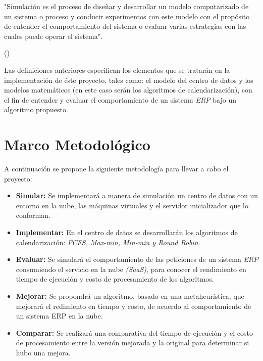 \begin{center}
	\begin{minipage}{0.8\linewidth}
		\vspace{5pt}%
		{\small
			"Simulación es el proceso de diseñar y desarrollar un modelo computarizado de un sistema o proceso y conducir experimentos con este modelo con el propósito de entender el comportamiento del sistema o evaluar varias estrategias con las cuales puede operar el sistema".
		}
		\begin{flushright}
			(\cite{shannon1976})
		\end{flushright}
		\vspace{5pt}%
	\end{minipage}
\end{center}

Las definiciones anteriores especifican los elementos que se tratarán en la implementación de éste proyecto, tales como: el modelo del centro de datos y los modelos matemáticos (en este caso serán los algoritmos de calendarización), con el fin de entender y evaluar el comportamiento de un sistema \textit{ERP} bajo un algoritmo propuesto. 
\newpage

\section{Marco Metodol\'ogico}

A continuaci\'on se propone la siguiente metodolog\'ia para llevar a cabo el proyecto:

\begin{itemize}
	\item \textbf{Simular:} Se implementar\'a a manera de simulaci\'on un centro de datos con un entorno en la nube, las m\'aquinas virtuales y el servidor inicializador que lo conforman.
	\item \textbf{Implementar:} En el centro de datos se desarrollar\'an los algoritmos de calendarizaci\'on: \textit{FCFS, Max-min, Min-min y Round Robin}.
	\item \textbf{Evaluar:} Se simular\'a el comportamiento de las peticiones de un sistema \textit{ERP} consumiendo el servicio en la nube \textit{(SaaS)}, para conocer el rendimiento en tiempo de ejecuci\'on y costo de procesamiento de los algoritmos.
	\item \textbf{Mejorar:} Se propondrá un algoritmo, basado en una metaheurística, que mejorará el redimiento en tiempo y costo, de acuerdo al comportamiento de un sistema ERP en la nube.
	\item \textbf{Comparar:} Se realizar\'a una comparativa del tiempo de ejecuci\'on y el costo de procesamiento entre la versi\'on mejorada y la original para determinar si hubo una mejora.
\end{itemize}




